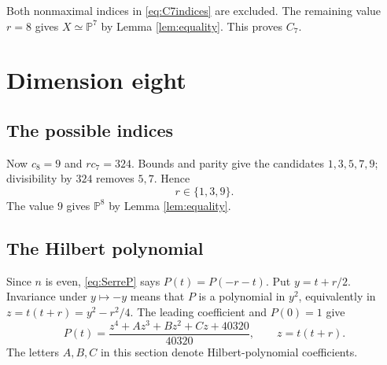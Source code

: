 \documentclass[11pt,reqno,letterpaper]{amsart}
\newcommand{\PP}{\mathbb P}
\theoremstyle{definition}
\numberwithin{equation}{section}
\begin{document}
Both nonmaximal indices in \eqref{eq:C7indices} are excluded.
The remaining value $r=8$ gives $X\simeq\PP^7$ by Lemma \ref{lem:equality}.
This proves $C_7$.

\section{Dimension eight}\label{sec:C8}

\subsection{The possible indices}
Now $c_8=9$ and $r c_7=324$. Bounds and parity give the candidates
$1,3,5,7,9$; divisibility by $324$ removes $5,7$. Hence
\begin{equation}\label{eq:C8indices}
 r\in\{1,3,9\}.
\end{equation}
The value $9$ gives $\PP^8$ by Lemma \ref{lem:equality}.

\subsection{The Hilbert polynomial}
Since $n$ is even, \eqref{eq:SerreP} says $P(t)=P(-r-t)$.
Put $y=t+r/2$. Invariance under $y\mapsto-y$ means that $P$ is a polynomial
in $y^2$, equivalently in $z=t(t+r)=y^2-r^2/4$.
The leading coefficient and $P(0)=1$ give
\begin{equation}\label{eq:C8P}
 P(t)=\frac{z^4+A z^3+B z^2+Cz+40320}{40320},
 \qquad z=t(t+r).
\end{equation}
The letters $A,B,C$ in this section denote Hilbert-polynomial coefficients.
\end{document}

